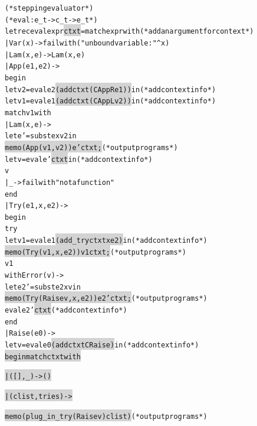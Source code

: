 \begin{figure}
%

\begin{alltt}
(* stepping evaluator *)
(* eval : e_t -> c_t -> e_t *)
let rec eval expr \colorbox{lightgray}{ctxt} = match expr with       (* add an argument for context *)
  | Var (x) -> failwith ("unbound variable: " ^ x)
  | Lam (x, e) -> Lam (x, e)
  | App (e1, e2) ->
    begin
      let v2 = eval e2 \colorbox{lightgray}{(add ctxt (CAppR e1))} in           (* add context info *)
      let v1 = eval e1 \colorbox{lightgray}{(add ctxt (CAppL v2))} in           (* add context info *)
      match v1 with
      | Lam (x, e) ->
        let e' = subst e x v2 in
        \colorbox{lightgray}{memo (App (v1, v2)) e' ctxt;}                       (* output programs *)
        let v = eval e' \colorbox{lightgray}{ctxt} in                           (* add context info *)
        v
      | _ -> failwith "not a function"
    end
  | Try (e1, x, e2) ->
    begin
      try
        let v1 = eval e1 \colorbox{lightgray}{(add_try ctxt x e2)} in           (* add context info *)
        \colorbox{lightgray}{memo (Try (v1, x, e2)) v1 ctxt;}                    (* output programs *)
        v1
      with Error (v) ->
        let e2' = subst e2 x v in
        \colorbox{lightgray}{memo (Try (Raise v, x, e2)) e2' ctxt;}              (* output programs *)
        eval e2' \colorbox{lightgray}{ctxt}                                     (* add context info *)
    end
  | Raise (e0) ->
    let v = eval e0 \colorbox{lightgray}{(add ctxt CRaise)} in                  (* add context info *)
    \colorbox{lightgray}{begin match ctxt with                   }
\end{alltt}
\vspace{-18pt}
\begin{alltt}
    \colorbox{lightgray}{    | ([], _) -> ()                     }
\end{alltt}
\vspace{-18pt}
\begin{alltt}
    \colorbox{lightgray}{    | (clist, tries) ->                 }
\end{alltt}
\vspace{-18pt}
\begin{alltt}
    \colorbox{lightgray}{      memo (plug_in_try (Raise v) clist)}               (* output programs *)

\end{alltt}
\end{figure}
